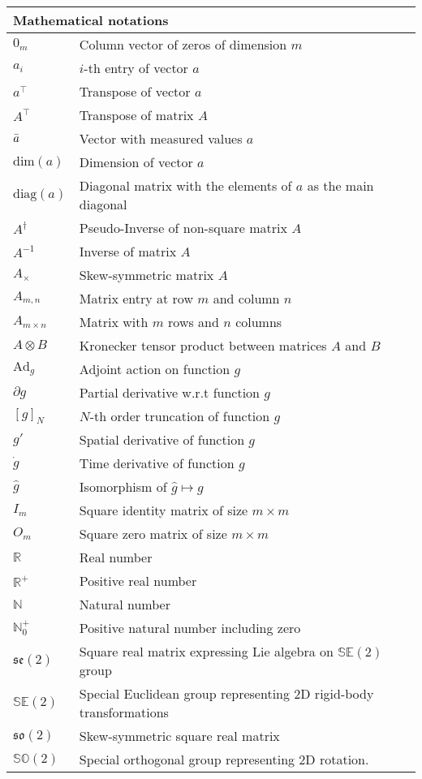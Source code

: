 \begin{spacing}{0.9}
\begin{multicols}{2}
\begin{table}[H]
\centering
    \begin{tabular}{p{1.5cm} p{5cm}} \hline
     \multicolumn{2}{l}{\textbf{Mathematical notations}}\\ \hline
    $0_m$    & Column vector of zeros of dimension $m$ \\
    $a_i$ & $i$-th entry of vector $a$ \\
    $a^\top$ & Transpose of vector $a$ \\
    $A^\top$ & Transpose of matrix $A$ \\
    $\Bar{a}$ & Vector with measured values $a$  \\
    $\text{dim}(a)$ & Dimension of vector $a$ \\
    $\text{diag}(a)$ & Diagonal matrix with the elements of $a$ as the main diagonal\\
    $A^\dagger$ & Pseudo-Inverse of non-square matrix $A$ \\
    $A^{-1}$ & Inverse of matrix $A$ \\
    $A_\times$ & Skew-symmetric matrix $A$ \\
    $A_{m,n}$ & Matrix entry at row $m$ and column $n$ \\
    $A_{m \times n}$ & Matrix with $m$ rows and $n$ columns \\
    $A \otimes B$ & Kronecker tensor product between matrices $A$ and $B$ \\
    $\text{Ad}_g$ & Adjoint action on function $g$\\
    $\partial g$     &  Partial derivative w.r.t function $g$\\ 
    $[g]_N$ & $N$-th order truncation of function $g$\\ 
    $g'$ & Spatial derivative of function $g$ \\
    $\dot{g}$ & Time derivative of function $g$ \\
    $\hat{g}$ & Isomorphism of $\hat{g} \longmapsto g$ \\
    $I_m$    & Square identity matrix of size $m \times m$ \\
    $O_m$    & Square zero matrix of size $m \times m$ \\
    $\mathbb{R}$ & Real number\\
    $\mathbb{R}^+$ & Positive real number\\
    $\mathbb{N}$ & Natural number\\
    $\mathbb{N}^+_0$ & Positive natural number including zero\\
    $\mathfrak{se}(2)$ & Square real matrix expressing Lie algebra on $\mathbb{SE}(2)$ group  \\
    $\mathbb{SE}(2)$ & Special Euclidean group representing 2D rigid-body transformations\\
    $\mathfrak{so}(2)$ & Skew-symmetric square real matrix\\
    $\mathbb{SO}(2)$ &  Special orthogonal group representing 2D rotation. \\
    \hline
    


\end{tabular}
\end{table}
\end{multicols}
\end{spacing}
